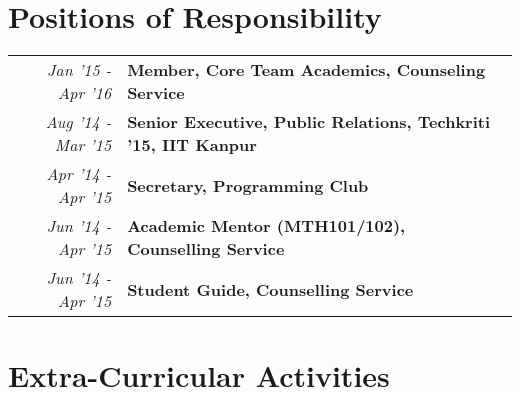 \documentclass[a4paper]{norm-resume}
\begin{document}
\vspace{0mm}	%


\section{Positions of Responsibility \hrulefill}

\vspace{0mm} %
		
	\begin{tabular}{r|p{16cm}}	

	\null \hspace{10mm} \normalsize\emph{Jan '15 - Apr '16} & \textbf{Member, Core Team Academics, Counseling Service}\\

	\normalsize\emph{Aug '14 - Mar '15} & \textbf{Senior Executive, Public Relations, Techkriti '15, IIT Kanpur}\\

	\normalsize\emph{Apr '14 - Apr '15} & \normalsize\textbf{Secretary, Programming Club}\\

	\normalsize\emph{Jun '14 - Apr '15} & \normalsize\textbf{Academic Mentor (MTH101/102), Counselling Service}\\ 

	\normalsize\emph{Jun '14 - Apr '15} & \normalsize\textbf{Student Guide, Counselling Service}\\

	\end{tabular}

\vspace{1mm}	%


\section{Extra-Curricular Activities  \hrulefill}

\vspace{2mm} %
\end{document}
